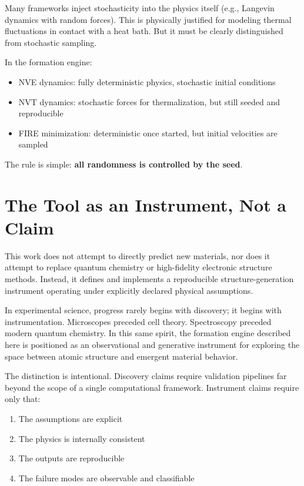 \documentclass[11pt]{article}
\begin{document}
Many frameworks inject stochasticity into the physics itself (e.g., Langevin dynamics with random forces). This is physically justified for modeling thermal fluctuations in contact with a heat bath. But it must be clearly distinguished from stochastic sampling.

In the formation engine:
\begin{itemize}
\item NVE dynamics: fully deterministic physics, stochastic initial conditions
\item NVT dynamics: stochastic forces for thermalization, but still seeded and reproducible
\item FIRE minimization: deterministic once started, but initial velocities are sampled
\end{itemize}

The rule is simple: \textbf{all randomness is controlled by the seed}.

\section{The Tool as an Instrument, Not a Claim}

This work does not attempt to directly predict new materials, nor does it attempt to replace quantum chemistry or high-fidelity electronic structure methods. Instead, it defines and implements a reproducible structure-generation instrument operating under explicitly declared physical assumptions.

In experimental science, progress rarely begins with discovery; it begins with instrumentation. Microscopes preceded cell theory. Spectroscopy preceded modern quantum chemistry. In this same spirit, the formation engine described here is positioned as an observational and generative instrument for exploring the space between atomic structure and emergent material behavior.

The distinction is intentional. Discovery claims require validation pipelines far beyond the scope of a single computational framework. Instrument claims require only that:

\begin{enumerate}
\item The assumptions are explicit
\item The physics is internally consistent  
\item The outputs are reproducible
\item The failure modes are observable and classifiable
\end{enumerate}
\end{document}
